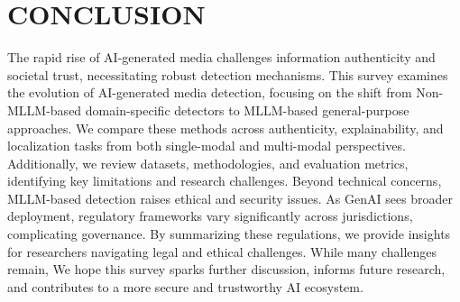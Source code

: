 
\section{CONCLUSION}
\label{sec:concl}
The rapid rise of AI-generated media challenges information authenticity and societal trust, necessitating robust detection mechanisms. This survey examines the evolution of AI-generated media detection, focusing on the shift from Non-MLLM-based domain-specific detectors to MLLM-based general-purpose approaches. We compare these methods across authenticity, explainability, and localization tasks from both single-modal and multi-modal perspectives. Additionally, we review datasets, methodologies, and evaluation metrics, identifying key limitations and research challenges.
Beyond technical concerns, MLLM-based detection raises ethical and security issues. As GenAI sees broader deployment, regulatory frameworks vary significantly across jurisdictions, complicating governance. By summarizing these regulations, we provide insights for researchers navigating legal and ethical challenges.
While many challenges remain, We hope this survey sparks further discussion, informs future research, and contributes to a more secure and trustworthy AI ecosystem.